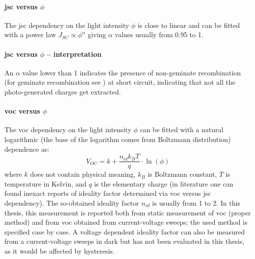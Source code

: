 \paragraph{\Gls{jsc} versus $\phi$}\label{methods_jsc_intensity} The \gls{jsc} dependency on the light intensity $\phi$ is close to linear and can be fitted with a power law $J_{SC} \propto \phi^\alpha$ giving $\alpha$ values usually from 0.95 to 1.

\paragraph{\Gls{jsc} versus $\phi$ -- interpretation} %
An $\alpha$ value lower than 1 indicates the presence of non-geminate recombination (for geminate recombination see ) at short circuit\cite{Credgington2011}, indicating that not all the photo-generated charges get extracted.

\paragraph{\Gls{voc} versus $\phi$}\label{methods_voc_intensity} The \gls{voc} dependency on the light intensity $\phi$ can be fitted with a natural logarithmic (the base of the logarithm comes from Boltzmann distribution) dependence as:
$$V_{OC} = k + \frac{n_{id} k_B T}{q}\cdot\ln(\phi)$$
where $k$ does not contain physical meaning, %
$k_B$ is Boltzmann constant, $T$ is temperature in Kelvin, and $q$ is the elementary charge\cite{Calado2018b} (in literature one can found inexact reports of ideality factor determined via \gls{voc} versus \gls{jsc} dependency). The so-obtained ideality factor $n_{id}$ is usually from 1 to 2. In this thesis, this measurement is reported both from static measurement of \gls{voc} (proper method) and from \gls{voc} obtained from current-voltage sweeps; the used method is specified case by case.	A voltage dependent ideality factor can also be measured from a current-voltage sweeps in dark but has not been evaluated in this thesis, as it would be affected by hysteresis. %

